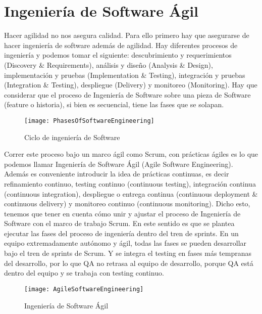 \chapter{Ingeniería de Software Ágil}

Hacer agilidad no nos asegura calidad. Para ello primero hay que asegurarse de hacer ingeniería de software además de agilidad. Hay diferentes procesos de ingeniería y podemos tomar el siguiente: descubrimiento y requerimientos (Discovery \& Requirements), análisis y diseño (Analysis \& Design), implementación y pruebas (Implementation \& Testing), integración y pruebas (Integration \& Testing), despliegue (Delivery) y monitoreo (Monitoring). Hay que considerar que el proceso de Ingeniería de Software sobre una pieza de Software (feature o historia), si bien es secuencial, tiene las fases que se solapan. 

\begin{figure}[h]
  \centering
  \texttt{[image: PhasesOfSoftwareEngineering]}
  \caption{Ciclo de ingeniería de Software}
  \centering
  \label{fig:PhasesOfSoftwareEngineering} %
\end{figure}

Correr este proceso bajo un marco ágil como Scrum, con prácticas ágiles es lo que podemos llamar Ingeniería de Software Ágil (Agile Software Engineering). Además es conveniente introducir la idea de prácticas continuas, es decir refinamiento continuo, testing continuo (continuous testing), integración continua (continuous integration), despliegue o entrega continua (continuous deployment \& continuous delivery) y monitoreo continuo (continuous monitoring). 
Dicho esto, tenemos que tener en cuenta cómo unir y ajustar el proceso de Ingeniería de Software con el marco de trabajo Scrum. En este sentido es que se plantea ejecutar las fases del proceso de ingeniería dentro del tren de sprints. En un equipo extremadamente autónomo y ágil, todas las fases se pueden desarrollar bajo el tren de sprints de Scrum. Y se integra el testing en fases más tempranas del desarrollo, por lo que QA no retrasa al equipo de desarrollo, porque QA está dentro del equipo y se trabaja con testing continuo.

\begin{figure}[h]
  \centering
  \texttt{[image: AgileSoftwareEngineering]}
  \caption{Ingeniería de Software Ágil}
  \centering
  \label{fig:AgileSoftwareEngineering} %
\end{figure}
